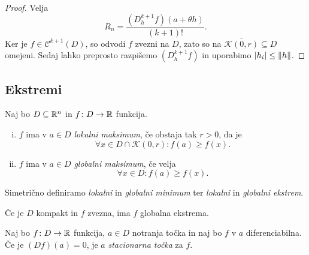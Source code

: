 \begin{proof}
Velja
\[
R_n = \frac{(D_h^{k+1}f)(a + \theta h)}{(k+1)!}.
\]
Ker je $f \in \mathcal{C}^{k+1}(D)$, so odvodi $f$ zvezni na $D$,
zato so na $\overline{\mathcal{K}(0,r)} \subseteq D$ omejeni. Sedaj
lahko preprosto razpišemo $(D_h^{k+1}f)$ in uporabimo
$\left\lvert h_i\right\rvert \leq \left\lVert h\right\rVert$.
\end{proof}

\newpage

\subsection{Ekstremi}

\begin{definicija}
Naj bo $D \subseteq \mathbb{R}^n$ in $f \colon D \to \mathbb{R}$ funkcija.

\begin{enumerate}[i)]
\item $f$ ima v $a \in D$ \emph{lokalni maksimum}, če obstaja tak
$r > 0$,
da je
\[
\forall x \in D \cap \mathcal{K}(0,r) \colon f(a) \geq f(x).
\]
\item $f$ ima v $a \in D$ \emph{globalni maksimum}, če velja
\[
\forall x \in D \colon f(a) \geq f(x).
\]
\end{enumerate}

Simetrično definiramo \emph{lokalni} in \emph{globalni minimum} ter
\emph{lokalni} in \emph{globalni ekstrem}.
\end{definicija}

\begin{opomba}
Če je $D$ kompakt in $f$ zvezna, ima $f$ globalna ekstrema.
\end{opomba}

\begin{definicija}
Naj bo $f \colon D \to \mathbb{R}$ funkcija, $a \in D $ notranja točka in naj bo $f$ v $a$ diferenciabilna. Če je $(Df)(a) = 0$, je $a$
\emph{stacionarna točka} za
$f$.
\end{definicija}
